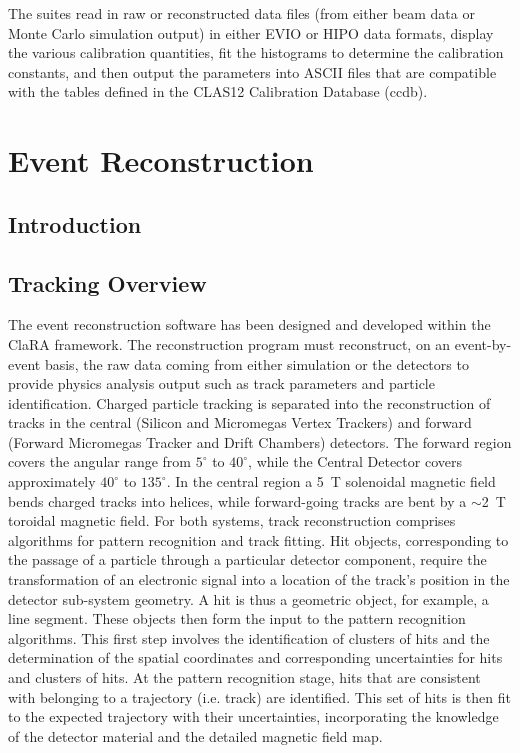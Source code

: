\documentclass{elsart}
\begin{document}
The suites read in raw or reconstructed data files (from either beam data or Monte Carlo simulation output) in
either EVIO or HIPO data formats, display the various calibration quantities, fit the histograms to determine
the calibration constants, and then output the parameters into ASCII files that are compatible with the tables
defined in the CLAS12 Calibration Database (ccdb).

\section{Event Reconstruction}

\subsection{Introduction}

\subsection{Tracking Overview}

The event reconstruction software has been designed and developed within the ClaRA framework. The
reconstruction program must reconstruct, on an event-by-event basis, the raw data coming from either
simulation or the detectors to provide physics analysis output such as track parameters and particle
identification. Charged particle tracking is separated into the reconstruction of tracks in the central
(Silicon and Micromegas Vertex Trackers) and forward (Forward Micromegas Tracker and Drift
Chambers) detectors. The forward region covers the angular range from $5^\circ$ to $40^\circ$, while
the Central Detector covers approximately $40^\circ$ to $135^\circ$. In the central region a 5~T
solenoidal magnetic field bends charged tracks into helices, while forward-going tracks are bent by a
$\sim$2~T toroidal magnetic field. For both systems, track reconstruction comprises algorithms for
pattern recognition and track fitting. Hit objects, corresponding to the passage of a particle through a
particular detector component, require the transformation of an electronic signal into a location of the
track's position in the detector sub-system geometry. A hit is thus a geometric object, for example, a
line segment. These objects then form the input to the pattern recognition algorithms. This first step
involves the identification of clusters of hits and the determination of the spatial coordinates and
corresponding uncertainties for hits and clusters of hits. At the pattern recognition stage, hits that are
consistent with belonging to a trajectory (i.e. track) are identified. This set of hits is then fit to the
expected trajectory with their uncertainties, incorporating the knowledge of the detector material and
the detailed magnetic field map.
\end{document}
